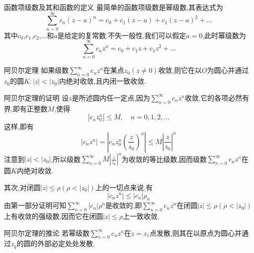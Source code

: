 \documentclass[zihao=-4,a4paper]{ctexart}
\begin{document}
\begin{mdefinition}{函数项级数及其和函数的定义}
	最简单的函数项级数是幂级数,其表达式为
	\begin{equation}
		\sum^{\infty}_{n=0} {c}_{n} {\left( {z} - {a} \right)}^{n} = {c}_{0} + {c}_{1} {\left( {z} - {a}\right)} + {c}_{1} {\left( {z} - {a} \right)}^{2} + ...
	\end{equation}
	其中${c}_{0}$,${c}_{1}$,${c}_{2}$,...和${a}$是给定的复常数.不失一般性,我们可以假定${a} = 0$,此时幂级数为
	\begin{equation}
		\sum^{\infty}_{n=0} {c}_{n} {z}^{n} = {c}_{0} + {c}_{1} {z} + {c}_{1} {z}^{2} + ...
	\end{equation}
\end{mdefinition}

\begin{mtheorem}{阿贝尔定理}
	如果级数$\sum^{\infty}_{n=0} {c}_{n} {z}^{n}$在某点${z}_{0} \left({z} {\neq} {0}\right)$收敛,则它在以$O$为圆心并通过${z}_{0}$的圆${K} : | {z} | {<} | {z}_{0} |$内绝对收敛,且内闭一致收敛.
\end{mtheorem}

\begin{mproof}{阿贝尔定理的证明}
	设$z$是所述圆内任一定点,因为$\sum^{\infty}_{n=0} {c}_{n} {z}^{n}$收敛,它的各项必然有界,即有正整数$M$,使得
	\begin{equation*}
		\left| {c}_{n} {z}^{n}_{0} \right| {\leqslant} {M}, {\quad} {n} = 0 , 1 , 2 , ...
	\end{equation*}
	这样,即有
	\begin{equation*}
		\left| {c}_{n} {z}^{n} \right| = \left| {c}_{n} {z}^{n}_{0} {\left( \frac{z}{{z}_{0}} \right)}^{n} \right| {\leqslant} M { \left| \frac{z}{{z}_{0}} \right| }^{n}
	\end{equation*}
	注意到$| {z} |{<} | {z}_{0} |$,所以级数$\sum^{\infty}_{n=0}M { \left| \frac{z}{{z}_{0}} \right| }^{n}$为收敛的等比级数,因而级数$\sum^{\infty}_{n=0} {c}_{n} {z}^{n}$在圆$K$内绝对收敛.

	其次,对闭圆$\left| {z} \right| {\leqslant} {\rho} \left( {\rho} < \left| {z}_{0} \right|\right)$上的一切点来说,有
	\begin{equation*}
		\left| {c}_{n} {z}^{n} \right| {\leqslant} \left| {c}_{n} \right| {\rho}_{n}
	\end{equation*}
	由第一部分证明可知$\sum^{\infty}_{n=0} \left| {c}_{n} \right| {\rho}^{n} $是收敛的,即$\sum^{\infty}_{n=0} {c}_{n} {z}^{n}$在闭圆$\left| {z} \right| {\leqslant} {\rho}\left( {\rho} < \left| {z}_{0} \right|\right)$上有收敛的强级数,因而它在闭圆$\left| {z} \right| {\leqslant} {\rho}$上一致收敛.
\end{mproof}
\begin{mcorollary}{阿贝尔定理的推论}
	若幂级数$\sum^{\infty}_{n=0} {c}_{n} {z}^{n}$在${z} = {z}_{1}$点发散,则其在以原点为圆心并通过${z}_{q}$的圆的外部必定处处发散.
\end{mcorollary}
\end{document}
